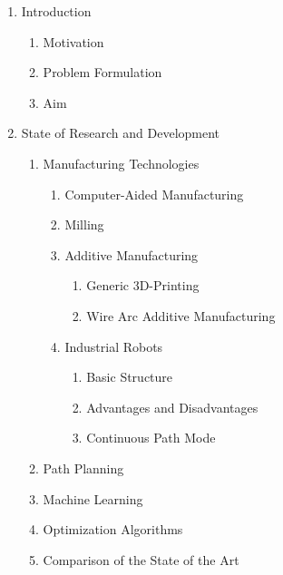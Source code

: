 \documentclass[ZLstudentexpose%
              ,optBiber%
              ,optEnglish%
              ,10pt
              ]{ZLlatex}%
\begin{document}
\begin{enumerate}
	\item Introduction	
		\begin{enumerate}
		\item Motivation
		\item Problem Formulation
		\item Aim
		\end{enumerate}
	\item State of Research and Development
		\begin{enumerate}
			\item Manufacturing Technologies
				\begin{enumerate}
				\item Computer-Aided Manufacturing
				\item Milling
				\item Additive Manufacturing
				\begin{enumerate}
					\item Generic 3D-Printing
					\item Wire Arc Additive Manufacturing 
				\end{enumerate}
					
				\item Industrial Robots
				\begin{enumerate}
					\item Basic Structure
					\item Advantages and Disadvantages 
					\item Continuous Path Mode
				\end{enumerate}
				\end{enumerate}
			
			\item Path Planning 
			\item Machine Learning
			\item Optimization Algorithms
			\item Comparison of the State of the Art 
		\end{enumerate}
	
	
	

\end{enumerate}
\end{document}
